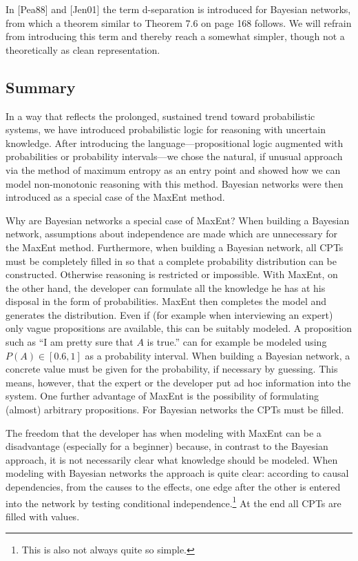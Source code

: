 \documentclass[10pt]{book}
\begin{document}
In [Pea88] and [Jen01] the term d-separation is introduced for Bayesian networks, from which a theorem similar to Theorem 7.6 on page 168 follows. We will refrain from introducing this term and thereby reach a somewhat simpler, though not a theoretically as clean representation.

\subsection{Summary}
In a way that reflects the prolonged, sustained trend toward probabilistic systems, we have introduced probabilistic logic for reasoning with uncertain knowledge. After introducing the language—propositional logic augmented with probabilities or probability intervals—we chose the natural, if unusual approach via the method of maximum entropy as an entry point and showed how we can model non-monotonic reasoning with this method. Bayesian networks were then introduced as a special case of the MaxEnt method.

Why are Bayesian networks a special case of MaxEnt? When building a Bayesian network, assumptions about independence are made which are unnecessary for the MaxEnt method. Furthermore, when building a Bayesian network, all CPTs must be completely filled in so that a complete probability distribution can be constructed. Otherwise reasoning is restricted or impossible. With MaxEnt, on the other hand, the developer can formulate all the knowledge he has at his disposal in the form of probabilities. MaxEnt then completes the model and generates the distribution. Even if (for example when interviewing an expert) only vague propositions are available, this can be suitably modeled. A proposition such as ``I am pretty sure that $A$ is true.'' can for example be modeled using $P(A) \in [0.6,1]$ as a probability interval. When building a Bayesian network, a concrete value must be given for the probability, if necessary by guessing. This means, however, that the expert or the developer put ad hoc information into the system. One further advantage of MaxEnt is the possibility of formulating (almost) arbitrary propositions. For Bayesian networks the CPTs must be filled.

The freedom that the developer has when modeling with MaxEnt can be a disadvantage (especially for a beginner) because, in contrast to the Bayesian approach, it is not necessarily clear what knowledge should be modeled. When modeling with Bayesian networks the approach is quite clear: according to causal dependencies, from the causes to the effects, one edge after the other is entered into the network by testing conditional independence.\footnote{This is also not always quite so simple.} At the end all CPTs are filled with values.
\end{document}
